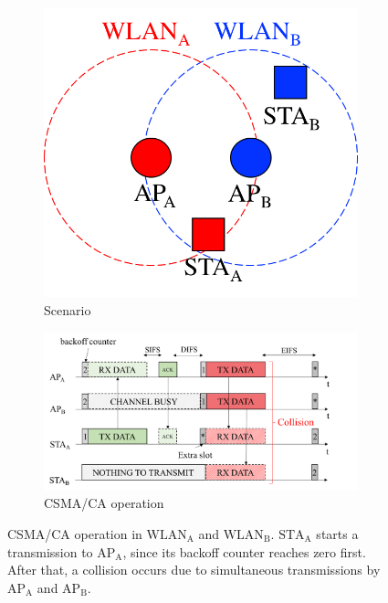 \documentclass[preprint,12pt]{elsarticle}
\begin{document}
\begin{figure}[h!]
	\centering		
	\begin{subfigure}[b]{0.25\textwidth}
		\includegraphics[width=\textwidth]{csma_a}
		\caption{Scenario}\label{fig:csma_a}
	\end{subfigure}
	\begin{subfigure}[b]{0.55\textwidth}
		\includegraphics[width=\textwidth]{csma_b}
		\caption{CSMA/CA operation}\label{fig:csma_b}
	\end{subfigure}
	\caption{CSMA/CA operation in $\text{WLAN}_{\text{A}}$ and $\text{WLAN}_{\text{B}}$. $\text{STA}_{\text{A}}$ starts a transmission to $\text{AP}_{\text{A}}$, since its backoff counter reaches zero first. After that, a collision occurs due to simultaneous transmissions by $\text{AP}_{\text{A}}$ and $\text{AP}_{\text{B}}$.}
	\label{fig:csma}
\end{figure}
\end{document}
